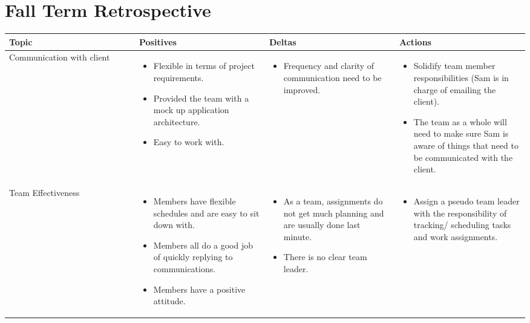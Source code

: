 \documentclass[letterpaper,10pt,titlepage,draftclsnofoot,onecolumn,onesided] {IEEEtran}
\begin{document}
\section{Fall Term Retrospective}
	\begin{center}
	\begin{singlespace}
		\begin{tabular}{ |  p{0.25\linewidth}  |  p{0.25\linewidth}  | p{0.25\linewidth} | p{0.25\linewidth} |}
		\hline
		Topic & Positives & Deltas & Actions \\ \hline
		
			Communication with client 
		& 
			\begin{itemize}
				\item Flexible in terms of project requirements.
				\item Provided the team with a mock up application architecture.
				\item Easy to work with.
			\end{itemize}
		& 
			\begin{itemize}
				\item Frequency and clarity of communication need to be improved.
			\end{itemize}
		&
			\begin{itemize}
				\item Solidify team member responsibilities (Sam is in charge of emailing the client).
				\item The team as a whole will need to make sure Sam is aware of things that need to be communicated with the client.
			\end{itemize} 
		\\ \hline
			Team Effectiveness 
		& 
			\begin{itemize}
				\item Members have flexible schedules and are easy to sit down with.
				\item Members all do a good job of quickly replying to communications.
				\item Members have a positive attitude.
			\end{itemize}
		& 
			\begin{itemize}
				\item As a team, assignments do not get much planning and are usually done last minute.
				\item There is no clear team leader.
			\end{itemize}
		&
			\begin{itemize}
				\item Assign a pseudo team leader with the responsibility of tracking/ scheduling tasks and work assignments.

\end{itemize}
\end{tabular}
\end{singlespace}
\end{center}
\end{document}
